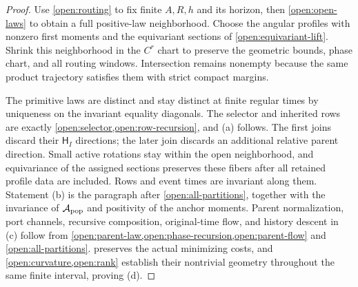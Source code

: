 \begin{proof}
Use \cref{open:routing} to fix finite $A,R,h$ and its horizon, then \cref{open:open-laws} to obtain a full positive-law neighborhood. Choose the angular profiles with nonzero first moments and the equivariant sections of \cref{open:equivariant-lift}. Shrink this neighborhood in the $C^r$ chart to preserve the geometric bounds, phase chart, and all routing windows. Intersection remains nonempty because the same product trajectory satisfies them with strict compact margins.

The primitive laws are distinct and stay distinct at finite regular times by uniqueness on the invariant equality diagonals. The selector and inherited rows are exactly \cref{open:selector,open:row-recursion}, and (a) follows. The first joins discard their $\mathsf H_I$ directions; the later join discards an additional relative parent direction. Small active rotations stay within the open neighborhood, and equivariance of the assigned sections preserves these fibers after all retained profile data are included. Rows and event times are invariant along them. Statement (b) is the paragraph after \cref{open:all-partitions}, together with the invariance of $\mathcal A_{\rm pop}$ and positivity of the anchor moments. Parent normalization, port channels, recursive composition, original-time flow, and history descent in (c) follow from \cref{open:parent-law,open:phase-recursion,open:parent-flow} and \cref{open:all-partitions}.  preserves the actual minimizing costs, and \cref{open:curvature,open:rank} establish their nontrivial geometry throughout the same finite interval, proving (d).
\end{proof}

